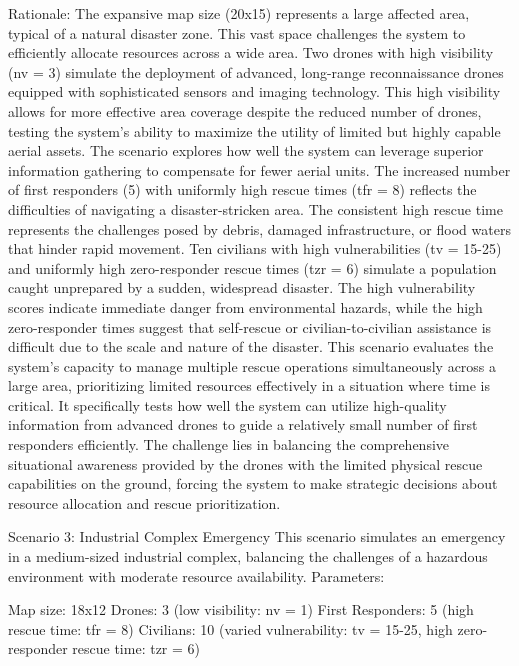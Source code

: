Rationale:
The expansive map size (20x15) represents a large affected area, typical of a natural disaster zone. This vast space challenges the system to efficiently allocate resources across a wide area.
Two drones with high visibility (nv = 3) simulate the deployment of advanced, long-range reconnaissance drones equipped with sophisticated sensors and imaging technology. This high visibility allows for more effective area coverage despite the reduced number of drones, testing the system's ability to maximize the utility of limited but highly capable aerial assets. The scenario explores how well the system can leverage superior information gathering to compensate for fewer aerial units.
The increased number of first responders (5) with uniformly high rescue times (tfr = 8) reflects the difficulties of navigating a disaster-stricken area. The consistent high rescue time represents the challenges posed by debris, damaged infrastructure, or flood waters that hinder rapid movement.
Ten civilians with high vulnerabilities (tv = 15-25) and uniformly high zero-responder rescue times (tzr = 6) simulate a population caught unprepared by a sudden, widespread disaster. The high vulnerability scores indicate immediate danger from environmental hazards, while the high zero-responder times suggest that self-rescue or civilian-to-civilian assistance is difficult due to the scale and nature of the disaster.
This scenario evaluates the system's capacity to manage multiple rescue operations simultaneously across a large area, prioritizing limited resources effectively in a situation where time is critical. It specifically tests how well the system can utilize high-quality information from advanced drones to guide a relatively small number of first responders efficiently. The challenge lies in balancing the comprehensive situational awareness provided by the drones with the limited physical rescue capabilities on the ground, forcing the system to make strategic decisions about resource allocation and rescue prioritization.

Scenario 3: Industrial Complex Emergency
This scenario simulates an emergency in a medium-sized industrial complex, balancing the challenges of a hazardous environment with moderate resource availability.
Parameters:

Map size: 18x12
Drones: 3 (low visibility: nv = 1)
First Responders: 5 (high rescue time: tfr = 8)
Civilians: 10 (varied vulnerability: tv = 15-25, high zero-responder rescue time: tzr = 6)

